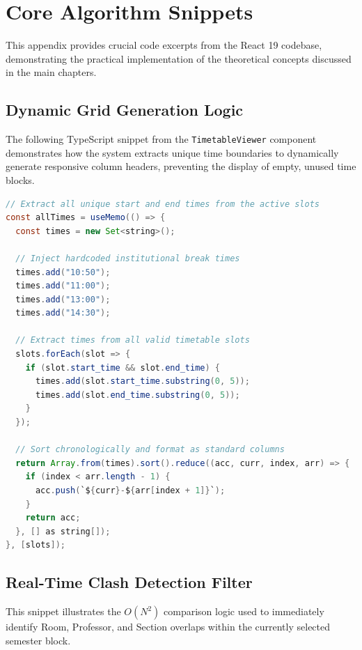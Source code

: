 
\chapter{Core Algorithm Snippets} %

\label{AppendixA} %

This appendix provides crucial code excerpts from the React 19 codebase, demonstrating the practical implementation of the theoretical concepts discussed in the main chapters.

\section{Dynamic Grid Generation Logic}
The following TypeScript snippet from the \texttt{TimetableViewer} component demonstrates how the system extracts unique time boundaries to dynamically generate responsive column headers, preventing the display of empty, unused time blocks.

\begin{lstlisting}[language=java, caption={Dynamic Time Column Extraction Algorithm}]
// Extract all unique start and end times from the active slots
const allTimes = useMemo(() => {
  const times = new Set<string>();
  
  // Inject hardcoded institutional break times
  times.add("10:50");
  times.add("11:00");
  times.add("13:00");
  times.add("14:30");
  
  // Extract times from all valid timetable slots
  slots.forEach(slot => {
    if (slot.start_time && slot.end_time) {
      times.add(slot.start_time.substring(0, 5));
      times.add(slot.end_time.substring(0, 5));
    }
  });

  // Sort chronologically and format as standard columns
  return Array.from(times).sort().reduce((acc, curr, index, arr) => {
    if (index < arr.length - 1) {
      acc.push(`${curr}-${arr[index + 1]}`);
    }
    return acc;
  }, [] as string[]);
}, [slots]);
\end{lstlisting}

\section{Real-Time Clash Detection Filter}
This snippet illustrates the $O(N^2)$ comparison logic used to immediately identify Room, Professor, and Section overlaps within the currently selected semester block.

